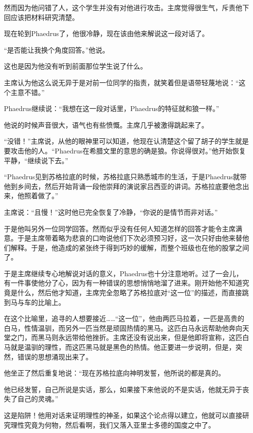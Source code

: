 \documentclass[UTF8]{article}
\begin{document}
\par 然而因为他问错了人，这个学生并没有对他进行攻击。主席觉得很生气，斥责他下回应该把材料研究清楚。
\par 现在轮到Phaedrus了，他很冷静，现在该由他来解说这一段对话了。
\par “是否能让我换个角度回答。”他说。
\par 这也是因为他没有听到前面那位学生说了什么。
\par 主席认为他这么说无异于是对前一位同学的指责，就笑着但是语带轻蔑地说：“这个主意不错。”
\par Phaedrus继续说：“我想在这一段对话里，Phaedrus的特征就和狼一样。”
\par 他说的时候声音很大，语气也有些愤慨。主席几乎被激得跳起来了。
\par “没错！”主席说，从他的眼神里可以知道，他现在认清楚这个留了胡子的学生就是要攻击他的人。“Phaedrus在希腊文里的意思的确是狼。你说得很对。”他开始恢复平静，“继续说下去。”
\par “Phaedrus见到苏格拉底的时候，苏格拉底只熟悉城市的生活，于是Phaedrus就带他到乡间去，然后开始背诵一段他崇拜的演说家吕西亚的讲词。苏格拉底要他念出来，他照着做了。”
\par 主席说：“且慢！”这时他已完全恢复了冷静，“你说的是情节而非对话。”
\par 于是他叫另外一位同学回答。然而似乎没有任何人知道怎样的回答才能令主席满意。于是主席带着略为悲哀的口吻说他们下次必须预习好，这一次只好由他来替他们解释。于是，他造成的紧张终于得到巧妙的缓解，而整个班级也在他的股掌之间了。
\par 于是主席继续专心地解说对话的意义，Phaedrus也十分注意地听。过了一会儿，有一件事使他分了心，因为有一种错误的思想悄悄地溜了进来。刚开始他不知道究竟是什么，然后他才知道，主席完全忽略了苏格拉底对“这一位”的描述，而直接跳到马与车的比喻上。
\par 在这个比喻里，追寻的人想要接近……“这一位”，他由两匹马拉着，一匹是高贵的白马，性情温驯，而另外一匹当然是顽固热情的黑马。这匹白马永远帮助他奔向天堂之门，而黑马则永远带给他挫折。主席还没有说出来，但是他即将宣称，这匹白马就是温驯的理性，而这匹黑马就是黑色的热情。他正要进一步说明，但是，突然，错误的思想涌现出来了。
\par 他坐正了然后重复地说：“现在苏格拉底向神明发誓，他所说的都是真的。
\par 他已经发誓，自己所说是实话，那么，如果接下来他说的不是实话，他就无异于丧失了自己的灵魂。”
\par 这是陷阱！他用对话来证明理性的神圣，如果这个论点得以建立，他就可以直接研究理性究竟为何物，然后看啊，我们又落入亚里士多德的国度之中了。
\end{document}
